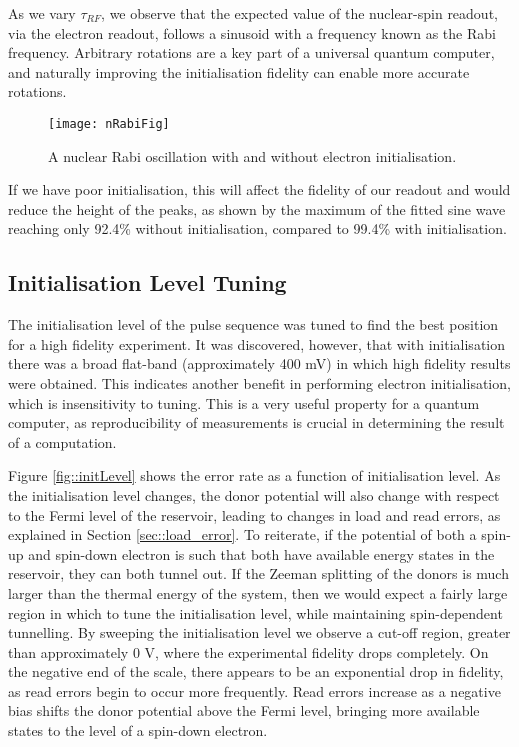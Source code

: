 	
	As we vary $\tau_{RF}$, we observe that the expected value of the nuclear-spin readout, via the electron readout, follows a sinusoid with a frequency known as the Rabi frequency. Arbitrary rotations are a key part of a universal quantum computer, and naturally improving the initialisation fidelity can enable more accurate rotations.
	
	\begin{figure}[H]
		\centering
		\texttt{[image: nRabiFig]}
		\caption{A nuclear Rabi oscillation with and without electron initialisation.}
		\label{fig::nuclear_rabi}
	\end{figure}
	
	If we have poor initialisation, this will affect the fidelity of our readout and would reduce the height of the peaks, as shown by the maximum of the fitted sine wave reaching only 92.4\% without initialisation, compared to 99.4\% with initialisation.

\subsection{Initialisation Level Tuning}
	The initialisation level of the pulse sequence was tuned to find the best position for a high fidelity experiment. It was discovered, however, that with initialisation there was a broad  flat-band (approximately 400 mV) in which high fidelity results were obtained. This indicates another benefit in performing electron initialisation, which is insensitivity to tuning. This is a very useful property for a quantum computer, as reproducibility of measurements is crucial in determining the result of a computation.
	
	Figure \ref{fig::initLevel} shows the error rate as a function of initialisation level. As the initialisation level changes, the donor potential will also change with respect to the Fermi level of the reservoir, leading to changes in load and read errors, as explained in Section \ref{sec::load_error}. To reiterate, if the potential of both a spin-up and spin-down electron is such that both have available energy states in the reservoir, they can both tunnel out. If the Zeeman splitting of the donors is much larger than the thermal energy of the system, then we would expect a fairly large region in which to tune the initialisation level, while maintaining spin-dependent tunnelling. 
	By sweeping the initialisation level we observe a cut-off region, greater than approximately 0 V, where the experimental fidelity drops completely. On the negative end of the scale, there appears to be an exponential drop in fidelity, as read errors begin to occur more frequently. Read errors increase as a negative bias shifts the donor potential above the Fermi level, bringing more available states to the level of a spin-down electron.
	
